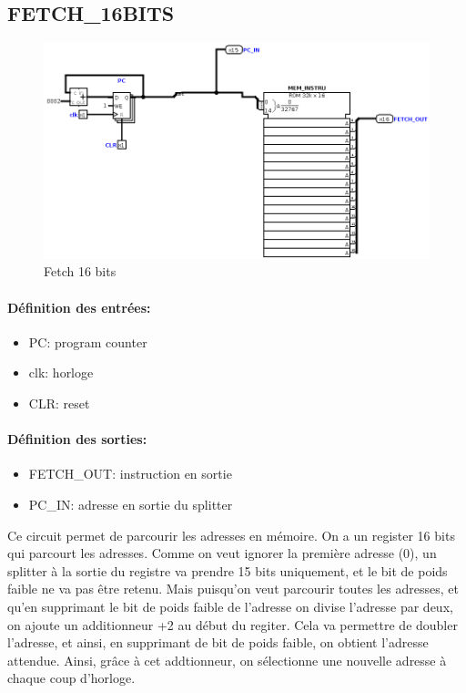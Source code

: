 \documentclass[a4paper]{article} %
\begin{document}
\subsection{FETCH\_16BITS}
\begin{figure}[H]
    \centering
    \includegraphics[width=1\textwidth]{src/FETCH.png}
    \caption{Fetch 16 bits}
    \label{fetch_16bits}
\end{figure}
\paragraph{Définition des entrées:}
\begin{itemize}
    \item     PC: program counter
    \item     clk: horloge
    \item     CLR: reset
\end{itemize}

\paragraph{Définition des sorties:}
\begin{itemize}
    \item FETCH\_OUT: instruction en sortie
    \item     PC\_IN: adresse en sortie du splitter
\end{itemize}
\medskip
Ce circuit permet de parcourir les adresses en mémoire. On a un register 16 bits qui parcourt les adresses. Comme on veut ignorer la première adresse (0), un splitter à la sortie du registre va prendre 15 bits uniquement, et le bit de poids faible ne va pas être retenu. Mais puisqu'on veut parcourir toutes les adresses, et qu'en supprimant le bit de poids faible de l'adresse on divise l'adresse par deux, on ajoute un additionneur +2 au début du regiter. Cela va permettre de doubler l'adresse, et ainsi, en supprimant de bit de poids faible, on obtient l'adresse attendue. Ainsi, grâce à cet addtionneur, on sélectionne une nouvelle adresse à chaque coup d'horloge.
\end{document}
